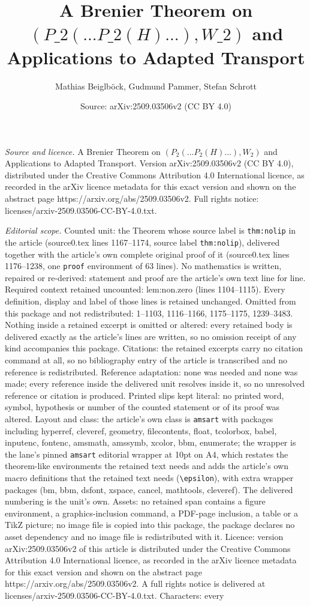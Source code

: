\documentclass[10pt,a4paper]{amsart}
\title[A Brenier Theorem on $(P\_2 (...P\_2(H)...), W\_2 )$ and Applic]{A Brenier Theorem on $(P\_2 (...P\_2(H)...), W\_2 )$ and Applications to Adapted Transport}
\author{Mathias Beiglb\"ock, Gudmund Pammer, Stefan Schrott}
\date{Source: arXiv:2509.03506v2 (CC BY 4.0)}
\begin{document}
\maketitle

\noindent\emph{Source and licence.} A Brenier Theorem on $(P_2 (...P_2(H)...), W_2 )$ and Applications to Adapted Transport. Version arXiv:2509.03506v2 (CC BY 4.0), distributed under the Creative Commons Attribution 4.0 International licence, as recorded in the arXiv licence metadata for this exact version and shown on the abstract page https://arxiv.org/abs/2509.03506v2. Full rights notice: licenses/arxiv-2509.03506-CC-BY-4.0.txt.\par\smallskip

\noindent\textit{Editorial scope.} Counted unit: the Theorem whose source label is \texttt{thm:nolip} in the article (source0.tex lines 1167--1174, source label \texttt{thm:nolip}), delivered together with the article's own complete original proof of it (source0.tex lines 1176--1238, one \texttt{proof} environment of 63 lines). No mathematics is written, repaired or re-derived: statement and proof are the article's own text line for line. Required context retained uncounted: lem:non.zero (lines 1104--1115). Every definition, display and label of those lines is retained unchanged. Omitted from this package and not redistributed: 1--1103, 1116--1166, 1175--1175, 1239--3483. Nothing inside a retained excerpt is omitted or altered: every retained body is delivered exactly as the article's lines are written, so no omission receipt of any kind accompanies this package. Citations: the retained excerpts carry no citation command at all, so no bibliography entry of the article is transcribed and no reference is redistributed. Reference adaptation: none was needed and none was made; every reference inside the delivered unit resolves inside it, so no unresolved reference or citation is produced. Printed slips kept literal: no printed word, symbol, hypothesis or number of the counted statement or of its proof was altered. Layout and class: the article's own class is \texttt{amsart} with packages including hyperref, cleveref, geometry, filecontents, float, tcolorbox, babel, inputenc, fontenc, amsmath, amssymb, xcolor, bbm, enumerate; the wrapper is the lane's pinned \texttt{amsart} editorial wrapper at 10pt on A4, which restates the theorem-like environments the retained text needs and adds the article's own macro definitions that the retained text needs (\texttt{\textbackslash epsilon}), with extra wrapper packages (bm, bbm, dsfont, xspace, cancel, mathtools, cleveref). The delivered numbering is the unit's own. Assets: no retained span contains a figure environment, a graphics-inclusion command, a PDF-page inclusion, a table or a TikZ picture; no image file is copied into this package, the package declares no asset dependency and no image file is redistributed with it. Licence: version arXiv:2509.03506v2 of this article is distributed under the Creative Commons Attribution 4.0 International licence, as recorded in the arXiv licence metadata for this exact version and shown on the abstract page https://arxiv.org/abs/2509.03506v2. A full rights notice is delivered at licenses/arxiv-2509.03506-CC-BY-4.0.txt. Characters: every 
\end{document}
